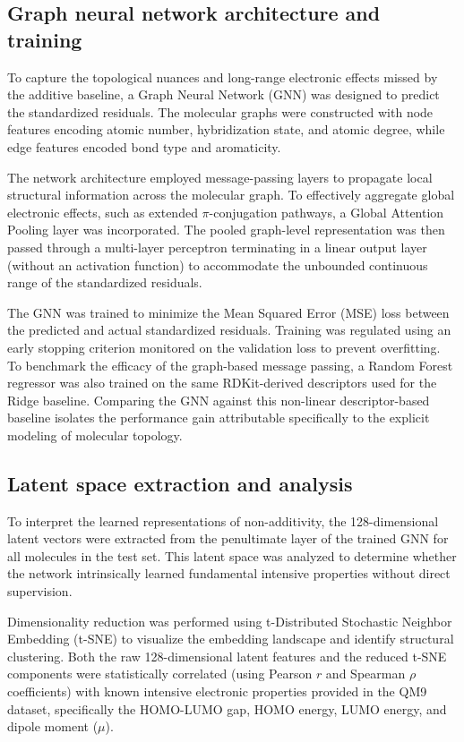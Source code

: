 \documentclass[]{article}
\begin{document}
\subsection{Graph neural network architecture and training}
To capture the topological nuances and long-range electronic effects missed by the additive baseline, a Graph Neural Network (GNN) was designed to predict the standardized residuals. The molecular graphs were constructed with node features encoding atomic number, hybridization state, and atomic degree, while edge features encoded bond type and aromaticity. 

The network architecture employed message-passing layers to propagate local structural information across the molecular graph. To effectively aggregate global electronic effects, such as extended $\pi$-conjugation pathways, a Global Attention Pooling layer was incorporated. The pooled graph-level representation was then passed through a multi-layer perceptron terminating in a linear output layer (without an activation function) to accommodate the unbounded continuous range of the standardized residuals.

The GNN was trained to minimize the Mean Squared Error (MSE) loss between the predicted and actual standardized residuals. Training was regulated using an early stopping criterion monitored on the validation loss to prevent overfitting. To benchmark the efficacy of the graph-based message passing, a Random Forest regressor was also trained on the same RDKit-derived descriptors used for the Ridge baseline. Comparing the GNN against this non-linear descriptor-based baseline isolates the performance gain attributable specifically to the explicit modeling of molecular topology.

\subsection{Latent space extraction and analysis}
To interpret the learned representations of non-additivity, the 128-dimensional latent vectors were extracted from the penultimate layer of the trained GNN for all molecules in the test set. This latent space was analyzed to determine whether the network intrinsically learned fundamental intensive properties without direct supervision. 

Dimensionality reduction was performed using t-Distributed Stochastic Neighbor Embedding (t-SNE) to visualize the embedding landscape and identify structural clustering. Both the raw 128-dimensional latent features and the reduced t-SNE components were statistically correlated (using Pearson $r$ and Spearman $\rho$ coefficients) with known intensive electronic properties provided in the QM9 dataset, specifically the HOMO-LUMO gap, HOMO energy, LUMO energy, and dipole moment ($\mu$).
\end{document}
